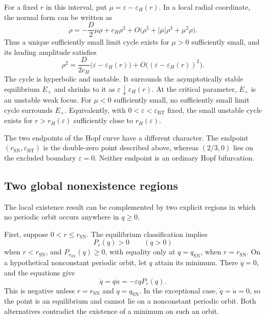 \documentclass[11pt,reqno]{amsart}
\theoremstyle{plain}
\theoremstyle{definition}
\theoremstyle{remark}
\begin{document}
For a fixed $r$ in this interval, put
$\mu=\varepsilon-\varepsilon_H(r)$. In a local radial coordinate,
the normal form can be written as
\begin{equation}
\dot\rho
=
-\frac{D}{2}\mu\rho
+
c_H\rho^3
+
O\bigl(
\rho^5+|\mu|\rho^3+\mu^2\rho
\bigr).
\label{eq:bl-radial-normal-form}
\end{equation}
Thus a unique sufficiently small limit cycle exists for
$\mu>0$ sufficiently small, and its leading amplitude satisfies
\begin{equation}
\rho^2
=
\frac{D}{2c_H}
\bigl(
\varepsilon-\varepsilon_H(r)
\bigr)
+
O\bigl(
(\varepsilon-\varepsilon_H(r))^2
\bigr).
\label{eq:bl-cycle-amplitude}
\end{equation}
The cycle is hyperbolic and unstable. It surrounds the
asymptotically stable equilibrium $E_+$ and shrinks to it as
$\varepsilon\downarrow\varepsilon_H(r)$. At the critical
parameter, $E_+$ is an unstable weak focus. For $\mu<0$
sufficiently small, no sufficiently small limit cycle surrounds
$E_+$. Equivalently, with
$0<\varepsilon<\varepsilon_{\mathrm{BT}}$ fixed, the small
unstable cycle exists for $r>r_H(\varepsilon)$ sufficiently
close to $r_H(\varepsilon)$.

The two endpoints of the Hopf curve have a different character.
The endpoint
$(r_{\mathrm{SN}},\varepsilon_{\mathrm{BT}})$ is the double-zero
point described above, whereas $(2/3,0)$ lies on the excluded
boundary $\varepsilon=0$. Neither endpoint is an ordinary
Hopf bifurcation.

\subsection{Two global nonexistence regions}
\label{subsec:bl-no-cycles}

The local existence result can be complemented by two explicit
regions in which no periodic orbit occurs anywhere in $q\geq0$.

First, suppose $0<r\leq r_{\mathrm{SN}}$. The equilibrium
classification implies
\[
P_r(q)>0
\qquad(q>0)
\]
when $r<r_{\mathrm{SN}}$, and
$P_{r_{\mathrm{SN}}}(q)\geq0$, with equality only at
$q=q_{\mathrm{SN}}$, when $r=r_{\mathrm{SN}}$.
On a hypothetical nonconstant periodic orbit, let $q$ attain
its minimum. There $\dot q=0$, and the equations give
\begin{equation}
\ddot q
=
q\dot u
=
-\varepsilon qP_r(q).
\label{eq:bl-minimum-argument}
\end{equation}
This is negative unless $r=r_{\mathrm{SN}}$ and
$q=q_{\mathrm{SN}}$. In the exceptional case,
$\dot q=\dot u=0$, so the point is an equilibrium and cannot
lie on a nonconstant periodic orbit. Both alternatives
contradict the existence of a minimum on such an orbit.
\end{document}
